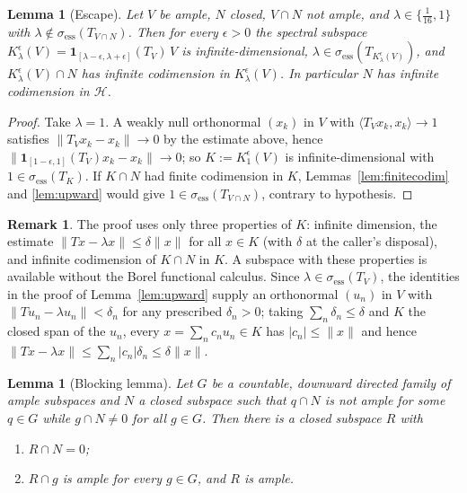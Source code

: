 \documentclass[11pt,reqno]{amsart}
\newtheorem{lemma}[theorem]{Lemma}
\theoremstyle{definition}
\newtheorem{remark}[theorem]{Remark}
\newcommand{\sess}{\sigma_{\mathrm{ess}}}
\newcommand{\HH}{\mathcal{H}}
\begin{document}
\begin{lemma}[Escape]\label{lem:escape}
Let $V$ be ample, $N$ closed, $V\cap N$ not ample, and
$\lambda\in\{\tfrac1{16},1\}$ with $\lambda\notin\sess(T_{V\cap N})$. Then for every
$\epsilon>0$ the spectral subspace
$K^\epsilon_\lambda(V)=\mathbf1_{[\lambda-\epsilon,\lambda+\epsilon]}(T_V)\,V$ is
infinite-dimensional, $\lambda\in\sess(T_{K^\epsilon_\lambda(V)})$, and
$K^\epsilon_\lambda(V)\cap N$ has infinite codimension in $K^\epsilon_\lambda(V)$. In
particular $N$ has infinite codimension in $\HH$.
\end{lemma}

\begin{proof}
Take $\lambda=1$. A weakly null orthonormal $(x_k)$ in $V$ with
$\langle T_Vx_k,x_k\rangle\to1$ satisfies $\|T_Vx_k-x_k\|\to0$ by the estimate above,
hence $\|\mathbf1_{[1-\epsilon,1]}(T_V)x_k-x_k\|\to0$; so $K:=K^\epsilon_1(V)$ is
infinite-dimensional with $1\in\sess(T_K)$. If $K\cap N$ had finite codimension in $K$,
Lemmas~\ref{lem:finitecodim} and \ref{lem:upward} would give $1\in\sess(T_{V\cap N})$,
contrary to hypothesis.
\end{proof}

\begin{remark}\label{rem:approxeigen}
The proof uses only three properties of $K$: infinite dimension, the estimate
$\|Tx-\lambda x\|\le\delta\|x\|$ for all $x\in K$ (with $\delta$ at the caller's
disposal), and infinite codimension of $K\cap N$ in $K$. A subspace with these
properties is available without the Borel functional calculus. Since
$\lambda\in\sess(T_V)$, the identities in the proof of Lemma~\ref{lem:upward} supply an
orthonormal $(u_n)$ in $V$ with $\|Tu_n-\lambda u_n\|<\delta_n$ for any prescribed
$\delta_n>0$; taking $\sum_n\delta_n\le\delta$ and $K$ the closed span of the $u_n$,
every $x=\sum_nc_nu_n\in K$ has $|c_n|\le\|x\|$ and hence
$\|Tx-\lambda x\|\le\sum_n|c_n|\delta_n\le\delta\|x\|$.
\end{remark}

\begin{lemma}[Blocking lemma]\label{lem:blocking}
Let $G$ be a countable, downward directed family of ample subspaces and $N$ a closed
subspace such that $q\cap N$ is not ample for some $q\in G$ while $g\cap N\neq0$ for all
$g\in G$. Then there is a closed subspace $R$ with
\begin{enumerate}
\item[(i)] $R\cap N=0$;
\item[(ii)] $R\cap g$ is ample for every $g\in G$, and $R$ is ample.
\end{enumerate}
\end{lemma}
\end{document}
